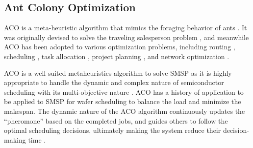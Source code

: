 \subsection{Ant Colony Optimization}
ACO is a %
meta-heuristic algorithm that mimics the foraging behavior of ants \cite{dorigo2019ant}.
It was originally devised to solve the traveling salesperson problem \cite{stutzle1999aco}, %
and meanwhile ACO has been adopted to various optimization problems, including routing \cite{rizzoli2007ant}, scheduling \cite{luo2008ant}, task allocation \cite{rugwiro2019task}, project planning \cite{khelifa2020holonic}, and network optimization \cite{wang2009hopnet}.

ACO is a well-suited metaheuristics algorithm to solve SMSP as it is highly appropriate to handle the dynamic and complex nature of semiconductor scheduling with its multi-objective nature \cite{nayar2021ant}. ACO has a history of application to be applied to SMSP for wafer scheduling to balance the load and minimize the makespan. The dynamic nature of the ACO algorithm continuously updates the “pheromone” based on the completed jobs, and guides others to follow the optimal scheduling decisions, ultimately making the system reduce their decision-making time \cite{zhou2022parameter}.



